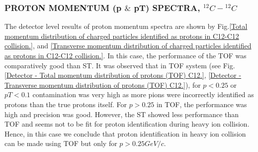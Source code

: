 \documentclass[12pt, twocolumn]{article}
\begin{document}
\subsubsection{PROTON MOMENTUM (p $\&$ pT) SPECTRA, $^{12}C-{^{12}C}$}
\label{PROTON MOMENTUM (p and pT) SPECTRA, C12-C12}
The detector level results of proton momentum spectra are shown by Fig.\ref{Total momentum distribution of charged particles identified as protons in C12-C12 collision.}, and \ref{Transverse momentum distribution of charged particles identified as protons in C12-C12 collision.}. In this case, the performance of the TOF was comparatively good than ST. It was observed that in TOF system (see Fig.\ref{Detector - Total momentum distribution of protons (TOF) C12.}, \ref{Detector - Transverse momentum distribution of protons (TOF) C12.}), for $p < 0.25$ or $pT < 0.1$ contamination was very high as more pions were incorrectly identified as protons than the true protons itself. For $p > 0.25$ in TOF, the performance was high and precision was good. However, the ST showed less performance than TOF and seems not to be fit for proton identification during heavy ion collision. Hence, in this case we conclude that proton identification in heavy ion collision can be made using TOF but only for $p > 0.25 GeV/c$.

 
\end{document}
